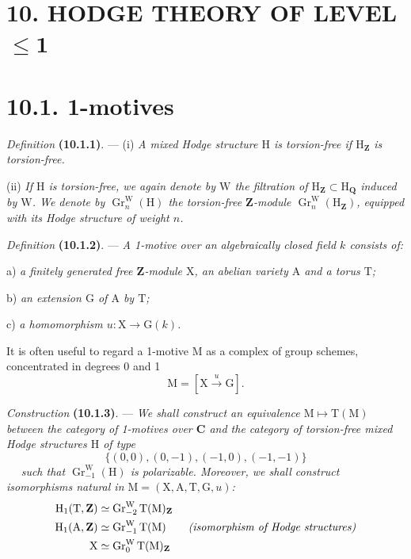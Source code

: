 \documentclass[11pt,leqno]{article}
\newcommand{\Page}[1]{\ifvmode\noindent\else\unskip\ \fi{\footnotesize\textcolor{gray}{[p.\,#1]}}\ \ignorespaces}
\begin{document}
\section*{10. HODGE THEORY OF LEVEL \(\leq\mathbf{1}\)}

\section*{10.1. 1-motives}

\textit{Definition} \textbf{(10.1.1)}. — (i)
\textit{A mixed Hodge structure \(\mathrm{H}\) is
\textup{torsion-free} if \(\mathrm{H}_{\mathbf{Z}}\) is torsion-free.}

(ii) \textit{If \(\mathrm{H}\) is torsion-free, we again denote by
\(\mathrm{W}\) the filtration of
\(\mathrm{H}_{\mathbf{Z}}\subset\mathrm{H}_{\mathbf{Q}}\) induced by
\(\mathrm{W}\). We denote by
\(\operatorname{Gr}^{\mathrm{W}}_n(\mathrm{H})\) the
torsion-free \(\mathbf{Z}\)-module
\(\operatorname{Gr}^{\mathrm{W}}_n(\mathrm{H}_{\mathbf{Z}})\), equipped with
its Hodge structure of weight \(n\).}

\textit{Definition} \textbf{(10.1.2)}. —
\textit{A \textup{1-motive} over an algebraically closed field \(k\)
consists of:}

\noindent a) \textit{a finitely generated free \(\mathbf{Z}\)-module
\(\mathrm{X}\), an abelian variety \(\mathrm{A}\) and a torus
\(\mathrm{T}\);}\par
\noindent b) \textit{an extension \(\mathrm{G}\) of \(\mathrm{A}\)
by \(\mathrm{T}\);}\par
\noindent c) \textit{a homomorphism
\(u:\mathrm{X}\to\mathrm{G}(k)\).}

It is often useful to regard a 1-motive \(\mathrm{M}\) as
a complex of group schemes, concentrated in degrees 0 and 1
\[
\mathrm{M}=[\mathrm{X}\xrightarrow{u}\mathrm{G}].
\]

\textit{Construction} \textbf{(10.1.3)}. —
\textit{We shall construct an equivalence
\(\mathrm{M}\mapsto\mathrm{T}(\mathrm{M})\) between the category of
1-motives over \(\mathbf{C}\) and the category of torsion-free mixed Hodge
structures \(\mathrm{H}\) of type}
\[
\{(0,0),(0,-1),(-1,0),(-1,-1)\}
\]
\Page{54}
\textit{such that \(\operatorname{Gr}^{\mathrm{W}}_{-1}(\mathrm{H})\)
is polarizable. Moreover, we shall construct isomorphisms natural in
\(\mathrm{M}=(\mathrm{X},\mathrm{A},\mathrm{T},\mathrm{G},u)\):}
\[
\begin{aligned}
\mathrm{H}_1(\mathrm{T},\mathbf{Z})
  &\simeq \operatorname{Gr}^{\mathrm{W}}_{-2}
          \mathrm{T}(\mathrm{M})_{\mathbf{Z}}
\\
\mathrm{H}_1(\mathrm{A},\mathbf{Z})
  &\simeq \operatorname{Gr}^{\mathrm{W}}_{-1}\mathrm{T}(\mathrm{M})
  \qquad \text{\textit{(isomorphism of Hodge structures)}}
\\
\mathrm{X}
  &\simeq \operatorname{Gr}^{\mathrm{W}}_0
          \mathrm{T}(\mathrm{M})_{\mathbf{Z}}
\end{aligned}
\]
\end{document}
